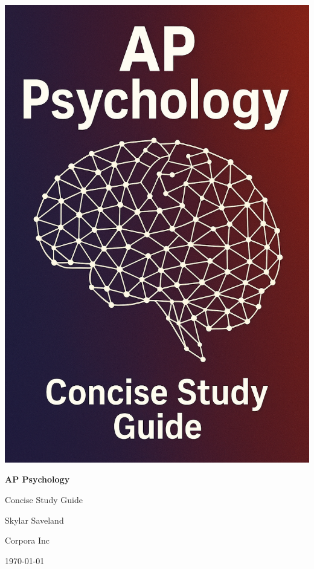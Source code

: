 \thispagestyle{empty}
\noindent
\includegraphics[width=\paperwidth,height=\paperheight]{book-resources/ap-psychology/study-guide-cover.png}%
\restoregeometry
\newpage

\begin{titlepage}
    \centering
    \vspace*{1in}
    {\Huge\bfseries AP Psychology \par}
    {\Large Concise Study Guide \par}
    \vspace{1in}
    {\Large Skylar Saveland\par}
    {\Large Corpora Inc\par}
    \vfill
    {\large \today\par}
\end{titlepage}

